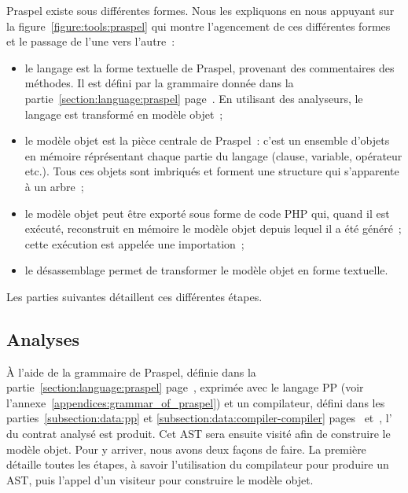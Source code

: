 Praspel existe sous différentes formes. Nous les expliquons en nous appuyant sur
la figure~\ref{figure:tools:praspel} qui montre l'agencement de ces différentes
formes et le passage de l'une vers l'autre~:
%
\begin{itemize}

\item le langage est la forme textuelle de Praspel, provenant des commentaires
des méthodes. Il est défini par la grammaire donnée dans la
partie~\ref{section:language:praspel} page~\pageref{section:language:praspel}.
En utilisant des analyseurs, le langage est transformé en modèle objet~;

\item le modèle objet  est la pièce centrale de Praspel~: c'est un
ensemble d'objets en mémoire réprésentant chaque partie du langage (clause,
variable, opérateur etc.). Tous ces objets sont imbriqués et forment une
structure qui s'apparente à un arbre~;

\item le modèle objet peut être exporté sous forme de code PHP qui, quand il est
exécuté, reconstruit en mémoire le modèle objet depuis lequel il a été généré~;
cette exécution est appelée une importation~;

\item le désassemblage permet de transformer le modèle objet en forme textuelle.

\end{itemize}
%
Les parties suivantes détaillent ces différentes étapes.

\subsection{Analyses}
\label{subsection:tools:interpretation}

À l'aide de la grammaire de Praspel, définie dans la
partie~\ref{section:language:praspel} page~\pageref{section:language:praspel},
exprimée avec le langage PP (voir l'annexe~\ref{appendices:grammar_of_praspel})
et un compilateur, défini dans les parties~\ref{subsection:data:pp} et
\ref{subsection:data:compiler-compiler} pages~\pageref{subsection:data:pp}
et~\pageref{subsection:data:compiler-compiler}, l' du contrat analysé est produit. Cet AST sera ensuite visité afin de
construire le modèle objet. Pour y arriver, nous avons deux façons de faire. La
première détaille toutes les étapes, à savoir l'utilisation du compilateur pour
produire un AST, puis l'appel d'un visiteur pour construire le modèle objet.

